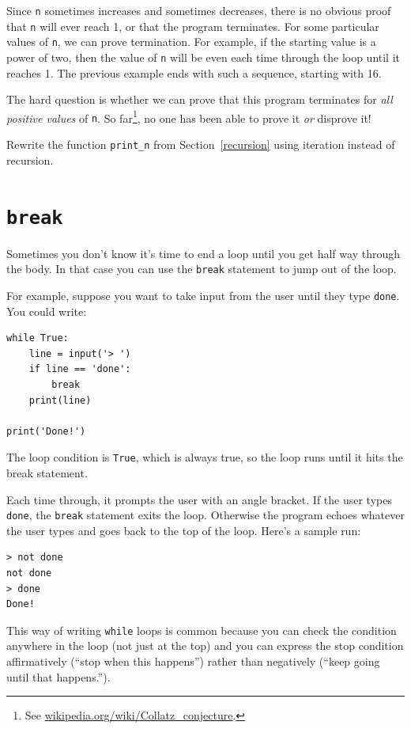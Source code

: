 \documentclass[10pt]{book}
\begin{document}
Since {\tt n} sometimes increases and sometimes decreases, there is no
obvious proof that {\tt n} will ever reach 1, or that the program
terminates.  For some particular values of {\tt n}, we can prove
termination.  For example, if the starting value is a power of two,
then the value of {\tt n} will be even each time through the loop
until it reaches 1. The previous example ends with such a sequence,
starting with 16.


The hard question is whether we can prove that this program terminates
for {\em all positive values} of {\tt n}.  So far\footnote{See
  \url{wikipedia.org/wiki/Collatz_conjecture}.}, no one has
been able to prove it {\em or} disprove it!

\begin{ex}
Rewrite the function \verb"print_n" from
Section~\ref{recursion} using iteration instead of recursion.
\end{ex}


\section{{\tt break}}

Sometimes you don't know it's time to end a loop until you get half
way through the body.  In that case you can use the {\tt break}
statement to jump out of the loop.

For example, suppose you want to take input from the user until they
type {\tt done}.  You could write:

\beforeverb
\begin{verbatim}
while True:
    line = input('> ')
    if line == 'done':
        break
    print(line)

print('Done!')
\end{verbatim}
\afterverb
%
The loop condition is {\tt True}, which is always true, so the
loop runs until it hits the break statement.

Each time through, it prompts the user with an angle bracket.
If the user types {\tt done}, the {\tt break} statement exits
the loop.  Otherwise the program echoes whatever the user types
and goes back to the top of the loop.  Here's a sample run:

\beforeverb
\begin{verbatim}
> not done
not done
> done
Done!
\end{verbatim}
\afterverb
%
This way of writing {\tt while} loops is common because you
can check the condition anywhere in the loop (not just at the
top) and you can express the stop condition affirmatively
(``stop when this happens'') rather than negatively (``keep going
until that happens.'').
\end{document}
